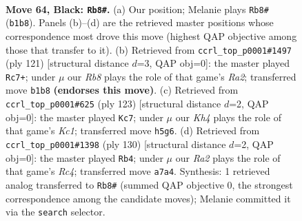 \documentclass[11pt]{article}
\begin{document}
\clearpage

\begin{figure}[p]\centering
\begin{subfigure}{0.46\textwidth}\centering
\resizebox{\linewidth}{!}{%
\newchessgame
\chessboard[
  setfen={7K/r7/8/7k/8/8/8/1r6 b - - 1 64},
  showmover=false,
  pgfstyle=straightmove, color=movearrow, markmove={b1-b8}
]}
\caption{}
\end{subfigure}\hfill
\begin{subfigure}{0.46\textwidth}\centering
\resizebox{\linewidth}{!}{%
\newchessgame
\chessboard[
  setfen={8/r7/1R6/8/6k1/2K5/8/8 b - - 2 61},
  showmover=false,
  pgfstyle=straightmove, color=movearrow, markmove={a7-c7}
]}
\caption{}
\end{subfigure}
\\[4pt]
\begin{subfigure}{0.46\textwidth}\centering
\resizebox{\linewidth}{!}{%
\newchessgame
\chessboard[
  setfen={2k5/8/3r4/8/8/8/6R1/2K5 b - - 25 62},
  showmover=false,
  pgfstyle=straightmove, color=movearrow, markmove={c8-c7}
]}
\caption{}
\end{subfigure}\hfill
\begin{subfigure}{0.46\textwidth}\centering
\resizebox{\linewidth}{!}{%
\newchessgame
\chessboard[
  setfen={3k4/8/7r/8/2R5/8/8/3K4 w - - 9 66},
  showmover=false,
  pgfstyle=straightmove, color=movearrow, markmove={c4-b4}
]}
\caption{}
\end{subfigure}
\caption{\textbf{Move 64, Black: \texttt{Rb8\#}.} (a) Our position; Melanie plays \texttt{Rb8\#} (\texttt{b1b8}). Panels (b)--(d) are the retrieved master positions whose correspondence most drove this move (highest QAP objective among those that transfer to it). (b) Retrieved from \texttt{ccrl\_top\_p0001\#1497} (ply 121) [structural distance $d$=3, QAP obj=0]: the master played \texttt{Rc7+}; under $\mu$ our \emph{Rb8} plays the role of that game's \emph{Ra2}; transferred move \texttt{b1b8} \textbf{(endorses this move)}. (c) Retrieved from \texttt{ccrl\_top\_p0001\#625} (ply 123) [structural distance $d$=2, QAP obj=0]: the master played \texttt{Kc7}; under $\mu$ our \emph{Kh4} plays the role of that game's \emph{Kc1}; transferred move \texttt{h5g6}. (d) Retrieved from \texttt{ccrl\_top\_p0001\#1398} (ply 130) [structural distance $d$=2, QAP obj=0]: the master played \texttt{Rb4}; under $\mu$ our \emph{Ra2} plays the role of that game's \emph{Rc4}; transferred move \texttt{a7a4}. Synthesis: 1 retrieved analog transferred to \texttt{Rb8\#} (summed QAP objective 0, the strongest correspondence among the candidate moves); Melanie committed it via the \texttt{search} selector.}
\label{fig:thought-m127}
\end{figure}
\end{document}
